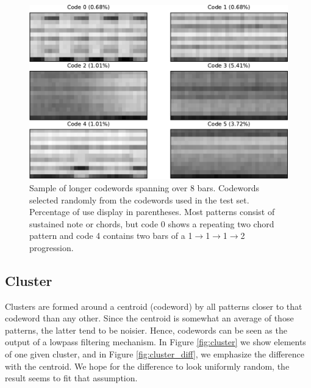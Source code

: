 \documentclass{article}
\begin{document}
\begin{figure}[t]
\begin{center}
\includegraphics[width=.8\columnwidth]{codes_8bars}
\end{center}
\caption{\small{Sample of longer codewords spanning over $8$
    bars. Codewords selected randomly from the codewords used in the
    test set. Percentage of use display in parentheses.  Most patterns
    consist of sustained note or chords, but code 0 shows a repeating
    two chord pattern and code 4 contains two bars of a
    1$\rightarrow$1$\rightarrow$1$\rightarrow$2 progression.}}
\label{fig:codes8bars}
\end{figure}


\subsection{Cluster}
Clusters are formed around a centroid (codeword) by all patterns closer
to that codeword than any other. Since the centroid is somewhat an
average of those patterns, the latter tend to be noisier. Hence, codewords
can be seen as the output of a lowpass filtering mechanism.
In Figure \ref{fig:cluster} we show elements of one given
cluster, and in Figure \ref{fig:cluster_diff}, we emphasize the difference
with the centroid. We hope for the difference to look uniformly random,
the result seems to fit that assumption.

\end{document}
